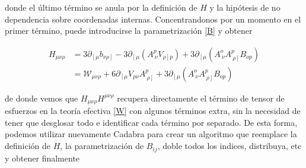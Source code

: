 \documentclass{article}
\numberwithin{equation}{section}
\begin{document}
donde el último término se anula por la definición de $ H $ y la hipótesis de no dependencia sobre coordenadas internas. Concentrandonos por un momento en el primer término, puede introducirse la parametrización \ref{B} y obtener

\begin{equation}
\begin{aligned}
H_{\mu \nu \rho} &= 3 \partial_{\left[\mu\right. } b_{\left.\nu \rho \right]} 
- 3 \partial_{\left[\mu\right.} \left( A^p_{\ \nu} V_{\left. \rho \right] p}\right)
+ 3 \partial_{\left[\mu\right.} \left( A^o_{\ \nu} A^p_{ \ \left. \rho \right]} B_{o p} \right)\\
&= \mathcal{W}_{\mu \nu \rho} + 6 \partial_{\left[ \mu\right.} V_{p \nu} A^p_{\ \left.\rho\right]} + 3 \partial_{\left[\mu\right.} \left( A^o_{\ \nu} A^p_{ \ \left. \rho \right]} B_{o p} \right)
\end{aligned}
\end{equation}

de donde vemos que $ H_{\mu \nu \rho} H^{\mu \nu \rho} $  recupera directamente el término de tensor de esfuerzos en la teoría efectiva \ref{W} con algunos términos extra, sin la necesidad de tener que desglosar todo e identificar cada término por separado. De esta forma, podemos utilizar nuevamente Cadabra para crear un algoritmo que reemplace la definición de $ H $, la parametrización de $ B_{i j} $, doble todos los indices, distribuya, etc y obtener finalmente
\end{document}
